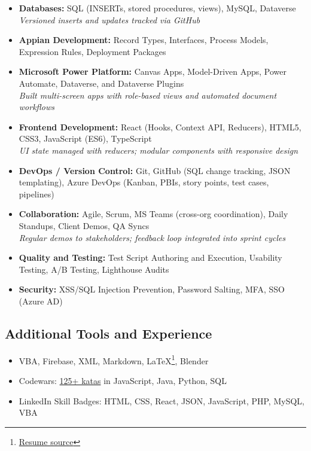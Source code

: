 \documentclass{article}
\begin{document}
\begin{itemize}
  \item \textbf{Databases:} SQL (INSERTs, stored procedures, views), MySQL, Dataverse\\
  \textit{Versioned inserts and updates tracked via GitHub}
  
  \item \textbf{Appian Development:} Record Types, Interfaces, Process Models, Expression Rules, Deployment Packages
  
  \item \textbf{Microsoft Power Platform:} Canvas Apps, Model-Driven Apps, Power Automate, Dataverse, and Dataverse Plugins\\
  \textit{Built multi-screen apps with role-based views and automated document workflows}
  
  \item \textbf{Frontend Development:} React (Hooks, Context API, Reducers), HTML5, CSS3, JavaScript (ES6), TypeScript\\
  \textit{UI state managed with reducers; modular components with responsive design}
  
  \item \textbf{DevOps / Version Control:} Git, GitHub (SQL change tracking, JSON templating), Azure DevOps (Kanban, PBIs, story points, test cases, pipelines)
  
  \item \textbf{Collaboration:} Agile, Scrum, MS Teams (cross-org coordination), Daily Standups, Client Demos, QA Syncs\\
  \textit{Regular demos to stakeholders; feedback loop integrated into sprint cycles}
  
  \item \textbf{Quality and Testing:} Test Script Authoring and Execution, Usability Testing, A/B Testing, Lighthouse Audits

  \item \textbf{Security:} XSS/SQL Injection Prevention, Password Salting, MFA, SSO (Azure AD)
\end{itemize}

\vspace{0.5em}
\subsection*{Additional Tools and Experience}
\begin{itemize}
  \item VBA, Firebase, XML, Markdown, \LaTeX\footnote{\href{https://github.com/sirkoik/CurriculumVitae/blob/master/source/main/resume.tex}{Resume source}}, Blender
  \item Codewars: \href{https://www.codewars.com/users/sirkoik}{125+ katas} in JavaScript, Java, Python, SQL
  \item LinkedIn Skill Badges: HTML, CSS, React, JSON, JavaScript, PHP, MySQL, VBA
\end{itemize}
\end{document}
